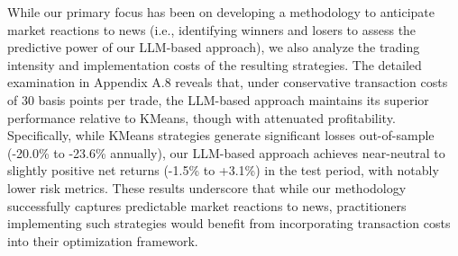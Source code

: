 While our primary focus has been on developing a methodology to anticipate market reactions to news (i.e., identifying winners and losers to assess the predictive power of our LLM-based approach), we also analyze the trading intensity and implementation costs of the resulting strategies. The detailed examination in Appendix A.8 reveals that, under conservative transaction costs of 30 basis points per trade, the LLM-based approach maintains its superior performance relative to KMeans, though with attenuated profitability. Specifically, while KMeans strategies generate significant losses out-of-sample (-20.0\% to -23.6\% annually), our LLM-based approach achieves near-neutral to slightly positive net returns (-1.5\% to +3.1\%) in the test period, with notably lower risk metrics. These results underscore that while our methodology successfully captures predictable market reactions to news, practitioners implementing such strategies would benefit from incorporating transaction costs into their optimization framework.
